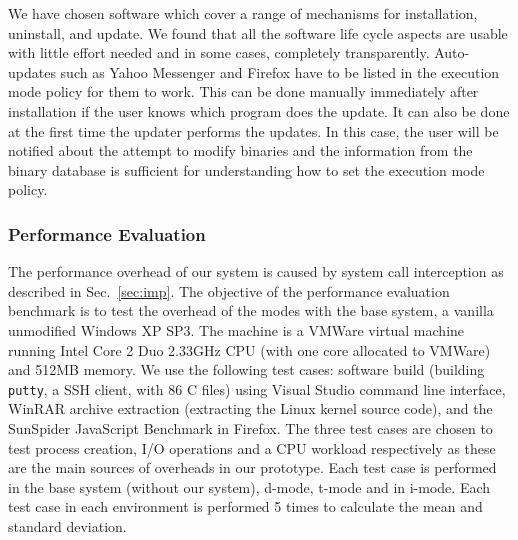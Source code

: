We have chosen software which cover a range of mechanisms for installation,
uninstall, and update.
We found that all the software life cycle aspects are usable
with little effort needed and in some cases, completely transparently.
Auto-updates such as Yahoo Messenger and Firefox have to be listed in
the execution mode policy for them to work.
This can be done manually immediately after installation if the user knows
which program does the update.
It can also be done at the first time the updater performs the updates.
In this case, the user will be notified about the attempt to modify binaries
and the information from the binary database is sufficient for understanding
how to set the execution mode policy.

\subsubsection{Performance Evaluation}

The performance overhead of our system is caused by system call interception
as described in Sec.~\ref{sec:imp}.
The objective of the performance evaluation benchmark is to test
the overhead of the modes with the base system,
a vanilla unmodified Windows XP SP3.
The machine is a VMWare virtual machine running Intel Core 2 Duo 2.33GHz
CPU (with one core allocated to VMWare) and 512MB memory.
We use the following test cases:
software build (building {\tt putty}, a SSH client, with 86 C files) using
Visual Studio command line interface,
WinRAR archive extraction (extracting the Linux kernel source code),
and the SunSpider JavaScript Benchmark in Firefox.
The three test cases are chosen to test process creation,
I/O operations and a CPU workload respectively as these are the
main sources of overheads in our prototype.
Each test case is performed in the base system (without our system),
d-mode, t-mode and in i-mode.
Each test case in each environment is performed 5 times to calculate the
mean and standard deviation.

